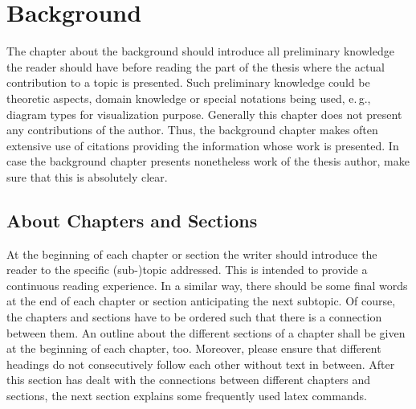 \chapter{Background}
\label{sect:basics}

The chapter about the background should introduce all preliminary knowledge the reader should have before reading the part of the thesis where the actual contribution to a topic is presented.
Such preliminary knowledge could be theoretic aspects, domain knowledge or special notations being used, e.\,g., diagram types for visualization purpose.
Generally this chapter does not present any contributions of the author.
Thus, the background chapter makes often extensive use of citations providing the information whose work is presented.
In case the background chapter presents nonetheless work of the thesis author, make sure that this is absolutely clear.







\section{About Chapters and Sections}
\label{sect:chaptsect}

At the beginning of each chapter or section the writer should introduce the reader to the specific (sub-)topic addressed.
This is intended to provide a continuous reading experience.
In a similar way, there should be some final words at the end of each chapter or section anticipating the next subtopic.
Of course, the chapters and sections have to be ordered such that there is a connection between them.
An outline about the different sections of a chapter shall be given at the beginning of each chapter, too.
Moreover, please ensure that different headings do not consecutively follow each other without text in between.
After this section has dealt with the connections between different chapters and sections, the next section explains some frequently used latex commands.

